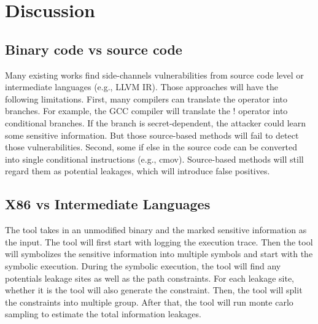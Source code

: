 \section{Discussion}

\subsection{Binary code vs source code}
Many existing works find side-channels vulnerabilities from source code level 
or intermediate languages (e.g., LLVM IR). Those approaches will have the following limitations. 
First, many compilers can translate the operator into branches. For example, 
the GCC compiler will translate the ! operator into conditional branches. 
If the branch is secret-dependent, the attacker could learn some sensitive information.
But those source-based methods will fail to detect those vulnerabilities. 
Second, some if else in the source code can be converted into single conditional 
instructions (e.g., cmov). Source-based methods will still regard them as potential leakages, 
which will introduce false positives.

\subsection{X86 vs Intermediate Languages}
The tool takes in an unmodified binary and the marked sensitive information as the input. 
The tool will first start with logging the execution trace. Then the tool will symbolizes the 
sensitive information into multiple symbols and start with the symbolic execution. 
During the symbolic execution, the tool will find any potentials leakage sites as well as the path constraints. 
For each leakage site, whether it is  the tool will also generate the constraint. 
Then, the tool will split the constraints into multiple group. After that, 
the tool will run monte carlo sampling to estimate the total information leakages.
